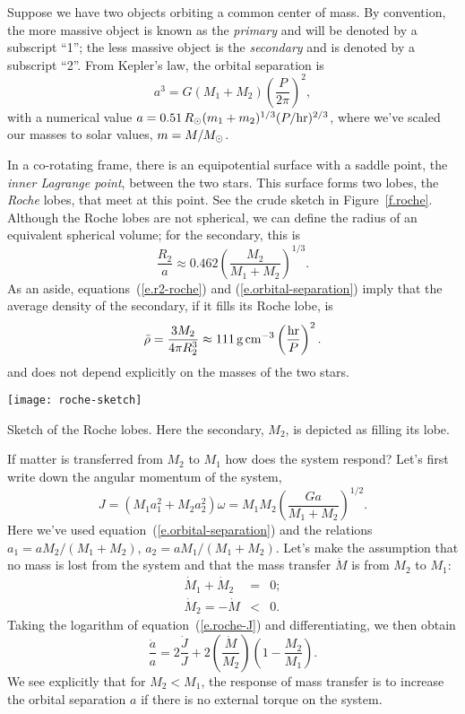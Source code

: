 Suppose we have two objects orbiting a common center of mass.  By convention, the more massive object is known as the \emph{primary} and will be denoted by a subscript ``1''; the less massive object is the \emph{secondary} and is denoted by a subscript ``2''.  From Kepler's law, the orbital separation is
\begin{equation}\label{e.orbital-separation}
	a^{3} = G(M_{1}+M_{2}) \left(\frac{P}{2\pi}\right)^{2}, 
\end{equation}
with a numerical value $a = 0.51\, R_{\odot} (m_{1}+m_{2})^{1/3} (P/\mathrm{hr})^{2/3}$, where we've scaled our masses to solar values, $m = M/M_\odot$.

In a co-rotating frame, there is an equipotential surface with a saddle point, the \emph{inner Lagrange point}, between the two stars.  This surface forms two lobes, the \emph{Roche} lobes, that meet at this point. See the crude sketch in Figure~\ref{f.roche}.
Although the Roche lobes are not spherical, we can define the radius of an equivalent spherical volume; for the secondary, this is
\begin{equation}\label{e.r2-roche}
\frac{R_{2}}{a} \approx 0.462 \left(\frac{M_{2}}{M_{1} + M_{2}}\right)^{1/3}.
\end{equation}
As an aside, equations~(\ref{e.r2-roche}) and (\ref{e.orbital-separation}) imply that the average density of the secondary, if it fills its Roche lobe, is
\[
	\bar{\rho} = \frac{3M_{2}}{4\pi R_{2}^{3}} \approx 111\,\mathrm{g}\,{\mathrm{c}\mathrm{m}}^{-3}\left(\frac{\mathrm{hr}}{P}\right)^{2}.
\]
and does not depend explicitly on the masses of the two stars.

\begin{marginfigure}
\texttt{[image: roche-sketch]}
\caption[Schematic of Roche lobes]{\label{f.roche} Sketch of the Roche lobes. Here the secondary, $M_{2}$, is depicted as filling its lobe.}
\end{marginfigure}

If matter is transferred from $M_{2}$ to $M_{1}$ how does the system respond?  Let's first write down the angular momentum of the system,
\begin{equation}\label{e.roche-J}
J = (M_{1}a_{1}^{2} + M_{2}a_{2}^{2}) \omega = M_{1}M_{2}\left(\frac{Ga}{M_{1}+M_{2}}\right)^{1/2}.
\end{equation}
Here we've used equation~(\ref{e.orbital-separation}) and the relations $a_{1} = aM_{2}/(M_{1}+M_{2})$, $a_{2} = aM_{1}/(M_{1}+M_{2})$.  Let's make the assumption that no mass is lost from the system and that the mass transfer $\dot{M}$ is from $M_{2}$ to $M_{1}$:
\begin{eqnarray*}
\dot{M}_{1} + \dot{M}_{2} &=& 0;\\
\dot{M}_{2} = -\dot{M} &<& 0.
\end{eqnarray*}
Taking the logarithm of equation~(\ref{e.roche-J}) and differentiating, we then obtain
\begin{equation}\label{e.roche-adot}
\frac{\dot{a}}{a} = 2\frac{\dot{J}}{J}  + 2 \left(\frac{\dot{M}}{M_{2}}\right) \left(1-\frac{M_{2}}{M_{1}}\right).
\end{equation}
We see explicitly that for $M_{2}< M_{1}$, the response of mass transfer is to increase the orbital separation $a$ if there is no external torque on the system.


